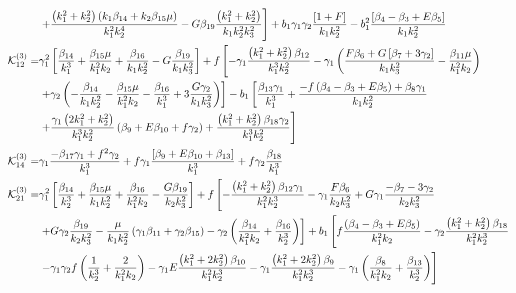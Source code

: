 \begin{align*}
&\left. + \frac{\left( k_1^2 + k_2^2 \right) \left( k_1 \beta_{14} + k_2 \beta_{15} \mu \right) }{k_1^2 k_2^4}  - G \beta_{19} \frac{\left( k_1^2 + k_2^2 \right)}{k_1 k_2^2 k_3^2}  \right] + b_1 \gamma_1 \gamma_2 \frac{\left[ 1 + F\right]}{k_1 k_2^2} - b_1^2 \frac{\left[ {\beta_{4}-\beta_{3}} + E \beta_{5}\right]}{k_1 k_2^2} \\
\ko_{12}^{(3)}=& \gamma_1^2 \left[ \frac{\beta_{14}}{k_1^3} + \frac{\beta_{15} \mu}{k_1^2 k_2} + \frac{\beta_{16}}{k_1 k_2^2} - G \frac{\beta_{19}}{k_1 k_3^2} \right] + f \left[ - \gamma_1 \frac{\left( k_1^2 + k_2^2 \right) \beta_{12}}{k_1^3 k_2^2} - \gamma_1 \left( \frac{F \beta_{6} + G \left[ \beta_{7} + 3 \gamma_2 \right]}{k_1 k_3^2} - \frac{\beta_{11} \mu }{k_1^2 k_2 }  \right) \right. \\
&\left. + \gamma_2 \left( - \frac{\beta_{14}}{k_1 k_2^2} - \frac{\beta_{15} \mu }{k_1^2 k_2} - \frac{\beta_{16}}{k_1^3} + 3 \frac{G \gamma_2}{k_1 k_3^2} \right) \right] - b_1 \left[ \frac{\beta_{13} \gamma_1}{k_1^3} + \frac{-f \left({\beta_{4}-\beta_{3}} + E \beta_{5} \right) + \beta_{8} \gamma_1}{k_1 k_2^2 } \right. \\
&\left. + \frac{\gamma_1 \left(2 k_1^2 + k_2^2\right)}{k_1^3 k_2^2} \left( \beta_{9} + E \beta_{10} + f \gamma_2 \right) + \frac{\left(k_1^2 + k_2^2\right) \beta_{18} \gamma_2}{k_1^3 k_2^2}  \right]\\
\ko_{14}^{(3)}=& \gamma_1 \frac{- \beta_{17} \gamma_1 + f^2 \gamma_2}{k_1^3} + f \gamma_1 \frac{\left[ \beta_{9} + E \beta_{10} + \beta_{13} \right]}{k_1^3} + f \gamma_2\frac{\beta_{18}}{k_1^3}\\
\ko_{21}^{(3)}=& \gamma_1^2 \left[  \frac{\beta_{14}}{k_2^3} + \frac{\beta_{15} \mu }{k_1 k_2^2} + \frac{\beta_{16}}{k_1^2 k_2} - \frac{G \beta_{19}}{k_2 k_3^2} \right] + f \left[  -\frac{\left( k_1^2 + k_2^2 \right)\beta_{12} \gamma_1 }{k_1^2 k_2^3}  - \gamma_1 \frac{F \beta_{6}}{k_2 k_3^2} +  G \gamma_1 \frac{-\beta_{7} - 3 \gamma_2}{k_2 k_3^2} \right. \\
&\left.+ G \gamma_2 \frac{\beta_{19}}{k_2 k_3^2} - \frac{\mu}{k_1 k_2^2} \left( \gamma_1 \beta_{11} + \gamma_2 \beta_{15} \right) - \gamma_2 \left( \frac{\beta_{14}}{k_1^2 k_2} + \frac{\beta_{16}}{k_2^3} \right) \right] + b_1 \left[ f \frac{\left( {\beta_{4}-\beta_{3}} + E \beta_{5} \right)}{k_1^2 k_2} - \gamma_2 \frac{\left( k_1^2 + k_2^2\right) \beta_{18}}{k_1^2 k_2^3} \right. \\
&\left. - \gamma_1 \gamma_2 f \left( \frac{1}{k_2^3} + \frac{2}{k_1^2 k_2}\right) - \gamma_1 E \frac{\left( k_1^2 + 2 k_2^2\right) \beta_{10} }{k_1^2 k_2^3} - \gamma_1 \frac{\left(k_1^2 + 2 k_2^2 \right) \beta_{9}}{k_1^2 k_2^3} - \gamma_1 \left( \frac{\beta_{8}}{k_1^2 k_2} + \frac{\beta_{13}}{k_2^3} \right) \right]\\

\end{align*}
